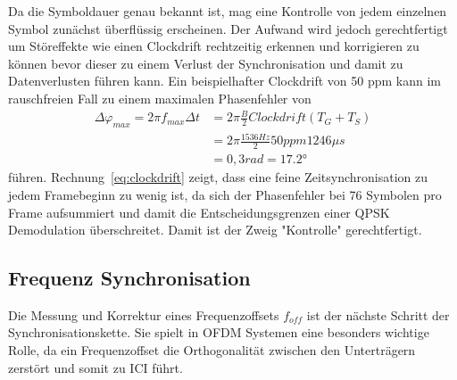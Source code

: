 Da die Symboldauer genau bekannt ist, mag eine Kontrolle von jedem einzelnen Symbol zunächst überflüssig erscheinen. Der Aufwand wird jedoch gerechtfertigt um Störeffekte wie einen Clockdrift rechtzeitig erkennen und korrigieren zu können bevor dieser zu einem Verlust der Synchronisation und damit zu Datenverlusten führen kann.
Ein beispielhafter Clockdrift von 50 ppm kann im rauschfreien Fall zu einem maximalen Phasenfehler von
\begin{equation}
\begin{aligned}
    \Delta\varphi_{max} = 2 \pi f_{max} \Delta t &= 2 \pi \frac{B}{2} Clockdrift (T_G+T_S) \\
    &=  2 \pi \frac{1536 Hz}{2} 50ppm 1246\mu s \\
    &= 0,3 rad = \ang{17,2}
    \end{aligned}
    \label{eq:clockdrift}
\end{equation}
führen. Rechnung~\ref{eq:clockdrift} zeigt, dass eine feine Zeitsynchronisation zu jedem Framebeginn zu wenig ist, da sich der Phasenfehler bei 76 Symbolen pro Frame aufsummiert und damit die Entscheidungsgrenzen einer QPSK Demodulation überschreitet. Damit ist der Zweig "Kontrolle" gerechtfertigt.


\subsection{Frequenz Synchronisation}
Die Messung und Korrektur eines Frequenzoffsets $f_{off}$ ist der nächste Schritt der Synchronisationskette. Sie spielt in OFDM Systemen eine besonders wichtige Rolle, da ein Frequenzoffset die Orthogonalität zwischen den Unterträgern zerstört und somit zu \ac{ICI} führt.

